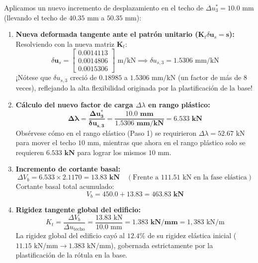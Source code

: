 \documentclass[11pt,letterpaper]{article}
\begin{document}
\begin{examplebox}
Aplicamos un nuevo incremento de desplazamiento en el techo de $\Delta u_3^* = 10.0\text{ mm}$ (llevando el techo de $40.35\text{ mm}$ a $50.35\text{ mm}$):
\begin{enumerate}
    \item \textbf{Nueva deformada tangente ante el patrón unitario ($\mathbf{K}_t \delta \mathbf{u}_s = \mathbf{s}$):}
    Resolviendo con la nueva matriz $\mathbf{K}_t$:
    \begin{equation}
        \delta \mathbf{u}_s = \begin{bmatrix} 0.0014113 \\ 0.0014806 \\ 0.0015306 \end{bmatrix} \text{ m/kN} \implies \delta u_{s,3} = 1.5306\text{ mm/kN}
    \end{equation}
    ¡Nótese que $\delta u_{s,3}$ creció de $0.18985$ a $1.5306\text{ mm/kN}$ (un factor de más de $8$ veces), reflejando la alta flexibilidad originada por la plastificación de la base!
    
    \item \textbf{Cálculo del nuevo factor de carga $\Delta \lambda$ en rango plástico:}
    \begin{equation}
        \mathbf{\Delta \lambda = \frac{\Delta u_3^*}{\delta u_{s,3}} = \frac{10.0\text{ mm}}{1.5306\text{ mm/kN}} = \mathbf{6.533\text{ kN}}}
    \end{equation}
    Obsérvese cómo en el rango elástico (Paso 1) se requirieron $\Delta \lambda = 52.67\text{ kN}$ para mover el techo $10\text{ mm}$, mientras que ahora en el rango plástico solo se requieren $\mathbf{6.533\text{ kN}}$ para lograr los mismos $10\text{ mm}$.
    
    \item \textbf{Incremento de cortante basal:}
    \begin{equation}
        \Delta V_b = 6.533 \times 2.1170 = \mathbf{13.83\text{ kN}} \quad (\text{Frente a } 111.51\text{ kN en la fase elástica})
    \end{equation}
    Cortante basal total acumulado:
    \begin{equation}
        V_b = 450.0 + 13.83 = \mathbf{463.83\text{ kN}}
    \end{equation}
    
    \item \textbf{Rigidez tangente global del edificio:}
    \begin{equation}
        K_t = \frac{\Delta V_b}{\Delta u_{\text{techo}}} = \frac{13.83\text{ kN}}{10.0\text{ mm}} = \mathbf{1.383\text{ kN/mm}} = 1,383\text{ kN/m}
    \end{equation}
    La rigidez global del edificio cayó al $\mathbf{12.4\%}$ de su rigidez elástica inicial ($11.15\text{ kN/mm} \to 1.383\text{ kN/mm}$), gobernada estrictamente por la plastificación de la rótula en la base.
\end{enumerate}
\end{examplebox}
\end{document}
